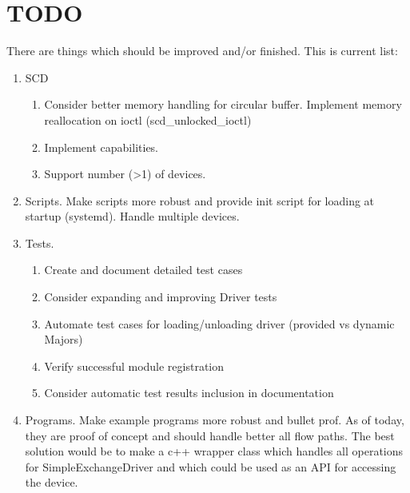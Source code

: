 \documentclass[11pt]{report}
\begin{document}
\section{TODO}
There are things which should be improved and/or finished. This is current list:
\begin{enumerate}
\item SCD
\begin{enumerate}
\item Consider better memory handling for circular buffer. Implement memory reallocation on ioctl (scd\_unlocked\_ioctl)
\item Implement capabilities.
\item Support number (\textgreater 1) of devices.
\end{enumerate}
\item Scripts. Make scripts more robust and provide init script for loading at startup (systemd). Handle multiple devices.
\item Tests.
\begin{enumerate}
\item Create and document detailed test cases
\item Consider expanding and improving Driver tests
\item Automate test cases for loading/unloading driver (provided vs dynamic Majors)
\item Verify successful module registration
\item Consider automatic test results inclusion in documentation
\end{enumerate}
\item Programs. Make example programs more robust and bullet prof. As of today, they are proof of concept and should handle better all flow paths. The best solution would be to make a c++ wrapper class which handles all operations for SimpleExchangeDriver and which could be used as an API for accessing the device.
\end{enumerate}
\end{document}

